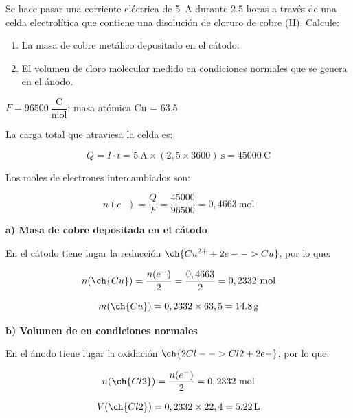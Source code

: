 \begin{exercise}
    Se hace pasar una corriente eléctrica de \SI{5}{\ampere} durante \num{2.5} horas a través de una celda electrolítica que contiene una disolución de cloruro de cobre (II). Calcule:
    \begin{enumerate}[label=\letraminuscula]
        \item La masa de cobre metálico depositado en el cátodo.
        \item El volumen de cloro molecular medido en condiciones normales que se genera en el ánodo.
    \end{enumerate}
    \datos{} \(F = \num{96500}\ \dfrac{\text{C}}{\text{mol}}\); masa atómica Cu = \num{63.5}
    \begin{solu}

        La carga total que atraviesa la celda es:

        \begin{equation*}
            Q = I \cdot t = 5 \ \si{\ampere} \times (2,5 \times 3600) \ \si{\s} = \SI{45000}{\coulomb}
        \end{equation*}

        Los moles de electrones intercambiados son:

        \begin{equation*}
            n(e^-) = \dfrac{Q}{F} = \dfrac{45000}{96500} = 0,4663 \ \text{mol}
        \end{equation*}

        \textbf{a) Masa de cobre depositada en el cátodo}

        En el cátodo tiene lugar la reducción \(\ch{Cu^{2+} + 2 e- -> Cu}\), por lo que:

        \begin{equation*}
            n(\ch{Cu}) = \dfrac{n(e^-)}{2} = \dfrac{0,4663}{2} = 0,2332 \ \text{mol}
        \end{equation*}

        \begin{equation*}
            m(\ch{Cu}) = 0,2332 \times 63,5 = \SI{14.8}{\gram}
        \end{equation*}

        \textbf{b) Volumen de  en condiciones normales}

        En el ánodo tiene lugar la oxidación \(\ch{2 Cl- -> Cl2 + 2 e-}\), por lo que:

        \begin{equation*}
            n(\ch{Cl2}) = \dfrac{n(e^-)}{2} = 0,2332 \ \text{mol}
        \end{equation*}

        \begin{equation*}
            V(\ch{Cl2}) = 0,2332 \times 22,4 = \SI{5.22}{\litre}
        \end{equation*}

    \end{solu}
\end{exercise}
